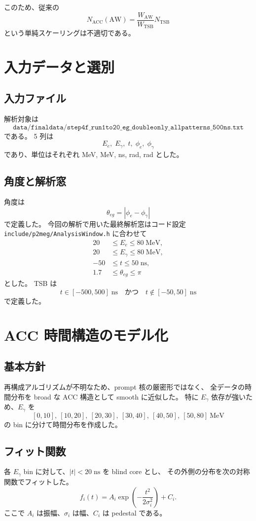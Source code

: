 \documentclass[a4paper,11pt]{jsarticle}
\begin{document}
このため、従来の
\[
N_{\mathrm{ACC}}(\mathrm{AW})
=
\frac{W_{\mathrm{AW}}}{W_{\mathrm{TSB}}} N_{\mathrm{TSB}}
\]
という単純スケーリングは不適切である。

\section{入力データと選別}
\subsection{入力ファイル}
解析対象は
\[
\texttt{data/finaldata/step4f\_run1to20\_eg\_doubleonly\_allpatterns\_500ns.txt}
\]
である。
5 列は
\[
E_e,\;E_\gamma,\;t,\;\phi_e,\;\phi_\gamma
\]
であり、単位はそれぞれ MeV, MeV, ns, rad, rad とした。

\subsection{角度と解析窓}
角度は
\[
\theta_{eg} = |\phi_e-\phi_\gamma|
\]
で定義した。
今回の解析で用いた最終解析窓はコード設定
\texttt{include/p2meg/AnalysisWindow.h}
に合わせて
\begin{align}
20 &\le E_e \le 80 \;\mathrm{MeV},\\
20 &\le E_\gamma \le 80 \;\mathrm{MeV},\\
-50 &\le t \le 50 \;\mathrm{ns},\\
1.7 &\le \theta_{eg} \le \pi
\end{align}
とした。
TSB は
\[
t\in[-500,500]\;\mathrm{ns}
\quad\text{かつ}\quad
t\notin[-50,50]\;\mathrm{ns}
\]
で定義した。

\section{ACC 時間構造のモデル化}
\subsection{基本方針}
再構成アルゴリズムが不明なため、prompt 核の厳密形ではなく、
全データの時間分布を broad な ACC 構造として smooth に近似した。
特に \(E_\gamma\) 依存が強いため、\(E_\gamma\) を
\[
[0,10],\ [10,20],\ [20,30],\ [30,40],\ [40,50],\ [50,80]\ \mathrm{MeV}
\]
の bin に分けて時間分布を作成した。

\subsection{フィット関数}
各 \(E_\gamma\) bin に対して、\(|t|<20\;\mathrm{ns}\) を blind core とし、
その外側の分布を次の対称関数でフィットした。
\begin{equation}
f_i(t)=A_i\exp\left(-\frac{t^2}{2\sigma_i^2}\right)+C_i.
\end{equation}
ここで \(A_i\) は振幅、\(\sigma_i\) は幅、\(C_i\) は pedestal である。
\end{document}
